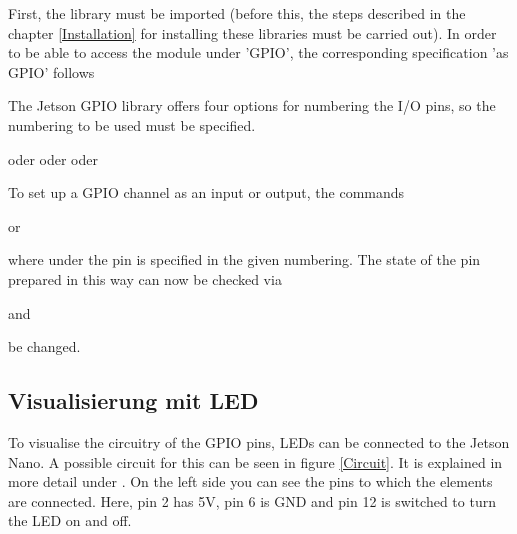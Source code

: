 First, the library must be imported (before this, the steps described in the chapter \ref{Installation} for installing these libraries must be carried out). In order to be able to access the module under 'GPIO', the corresponding specification 'as GPIO' follows

\medskip
{}
\medskip

The Jetson GPIO library offers four options for numbering the I/O pins, so the numbering to be used must be specified.

\medskip
{} \newline
oder \newline
{} \newline
oder \newline
{} \newline
oder \newline
{}
\medskip

To set up a GPIO channel as an input or output, the commands

\medskip
{} 

or 

\medskip

where under  the pin is specified in the given numbering. The state of the pin prepared in this way can now be checked via

\medskip
{}

and 

\medskip

be changed.

\subsection{Visualisierung mit LED}\label{LED}

To visualise the circuitry of the GPIO pins, LEDs can be connected to the Jetson Nano. A possible circuit for this can be seen in figure \ref{Circuit}. It is explained in more detail under \cite{JetsonHacks:2020}. On the left side you can see the pins to which the elements are connected. Here, pin 2 has 5V, pin 6 is GND and pin 12 is switched to turn the LED on and off.

